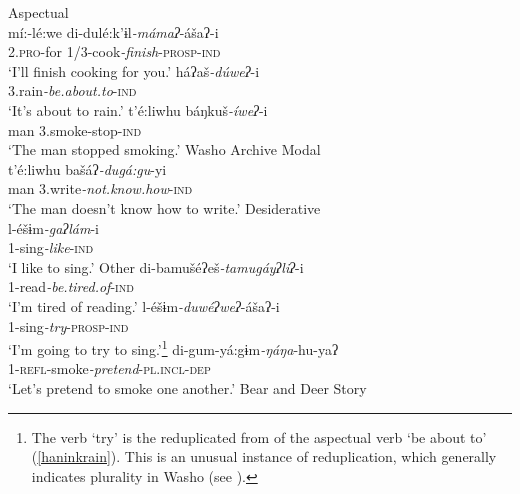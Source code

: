 \documentclass[output=paper]{langscibook}
\begin{document}
\ea Aspectual\label{haninkaspect}\\
\ex mí:-lé:we di-dulé:k'ɨl\textit{-mámaʔ}-ášaʔ-i\\
2.{\scshape pro}-for 1/3-cook\textit{-finish}-{\scshape prosp-ind}\\
\glt `I'll finish cooking for you.' 
\ex \gll háʔaš\textit{-dúweʔ}-i\\
3.rain\textit{-be.about.to}-{\scshape ind}\\
\glt `It's about to rain.'\label{haninkrain}
\ex \gll\label{haninksmoke} t'é:liwhu báŋkuš\textit{-íweʔ}-i\\
{} man 3.smoke-stop-{\scshape ind}\\
\glt `The man stopped smoking.' \hfill Washo Archive
\z
\ex Modal\\
{\gll t'é:liwhu bašáʔ\textit{-dugá:gu}-yi\\
 man 3.write\textit{-not.know.how}-{\scshape ind}\\
\glt `The man doesn't know how to write.'} \label{haninkmodal}
\ex Desiderative\label{haninkwant}\\
\ex  \gll l-éšɨm\textit{-gaʔlám}-i\\
1-sing\textit{-like}-{\scshape ind}\\
\glt `I like to sing.'
\z 
\ex Other\label{haninkother} 
\ea \gll di-bamušéʔeš\textit{-tamugáyʔliʔ}-i\\
1-read\textit{-be.tired.of}-{\scshape ind}\\
\glt `I'm tired of reading.'
\ex \gll l-éšɨm\textit{-duwéʔweʔ}-ášaʔ-i\\
1-sing\textit{-try}-{\scshape prosp-ind}\\
\glt `I'm going to try to sing.'\footnote{The verb `try' is the reduplicated from of the aspectual verb `be about to' (\ref{haninkrain}). This is an unusual instance of reduplication, which generally indicates plurality in Washo (see \citealt{yu2005,yu2012}).}
\ex \gll di-gum-yá:gɨm\textit{-ŋáŋa}-hu-yaʔ\\
1-{\scshape refl}-smoke\textit{-pretend}-{\scshape pl.incl-dep}\\
\glt `Let's pretend to smoke one another.' \hfill Bear and Deer Story
\z 
\z 
\end{document}
